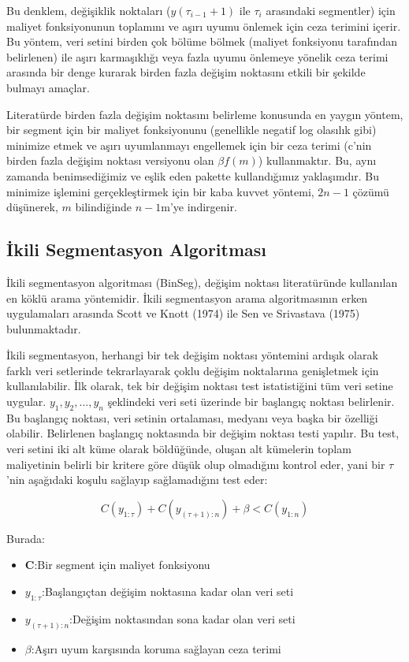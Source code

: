 \documentclass[12pt,twoside]{deuthesis}
\begin{document}
Bu denklem, değişiklik noktaları (\(y(\tau_{i-1}+1)\) ile \(\tau_i\) arasındaki segmentler) için maliyet fonksiyonunun toplamını ve aşırı uyumu önlemek için ceza terimini içerir. Bu yöntem, veri setini birden çok bölüme bölmek (maliyet fonksiyonu tarafından belirlenen) ile aşırı karmaşıklığı veya fazla uyumu önlemeye yönelik ceza terimi arasında bir denge kurarak birden fazla değişim noktasını etkili bir şekilde bulmayı amaçlar.

Literatürde birden fazla değişim noktasını belirleme konusunda en yaygın yöntem, bir segment için bir maliyet fonksiyonunu (genellikle negatif log olasılık gibi) minimize etmek ve aşırı uyumlanmayı engellemek için bir ceza terimi (c'nin birden fazla değişim noktası versiyonu olan \(\beta f(m)\)) kullanmaktır. Bu, aynı zamanda benimsediğimiz ve eşlik eden pakette kullandığımız yaklaşımdır. Bu minimize işlemini gerçekleştirmek için bir kaba kuvvet yöntemi, \(2n-1\) çözümü düşünerek, \(m\) bilindiğinde \(n-1\)m'ye indirgenir.

\hypertarget{ikili-segmentasyon-algoritmasux131}{%
\subsection{İkili Segmentasyon Algoritması}\label{ikili-segmentasyon-algoritmasux131}}

İkili segmentasyon algoritması (BinSeg), değişim noktası literatüründe kullanılan en köklü arama yöntemidir. İkili segmentasyon arama algoritmasının erken uygulamaları arasında Scott ve Knott (1974) ile Sen ve Srivastava (1975) bulunmaktadır.

İkili segmentasyon, herhangi bir tek değişim noktası yöntemini ardışık olarak farklı veri setlerinde tekrarlayarak çoklu değişim noktalarına genişletmek için kullanılabilir. İlk olarak, tek bir değişim noktası test istatistiğini tüm veri setine uygular. \(y_{1},y_{2},...,y_{n}\) şeklindeki veri seti üzerinde bir başlangıç noktası belirlenir. Bu başlangıç noktası, veri setinin ortalaması, medyanı veya başka bir özelliği olabilir. Belirlenen başlangıç noktasında bir değişim noktası testi yapılır. Bu test, veri setini iki alt küme olarak böldüğünde, oluşan alt kümelerin toplam maliyetinin belirli bir kritere göre düşük olup olmadığını kontrol eder, yani bir \(\tau\)'nin aşağıdaki koşulu sağlayıp sağlamadığını test eder:

\[C(y_{1:\tau}) + C(y_{(\tau+1):n}) + \beta < C(y_{1:n})\]

Burada:

\begin{itemize}
\item\textbf{C}:Bir segment için maliyet fonksiyonu
\item\textbf{$y_{1:\tau}$}:Başlangıçtan değişim noktasına kadar olan veri seti
\item\textbf{$y_{(\tau+1):n}$}:Değişim noktasından sona kadar olan veri seti
\item\textbf{$\beta$}:Aşırı uyum karşısında koruma sağlayan ceza terimi
\end{itemize}
\end{document}
